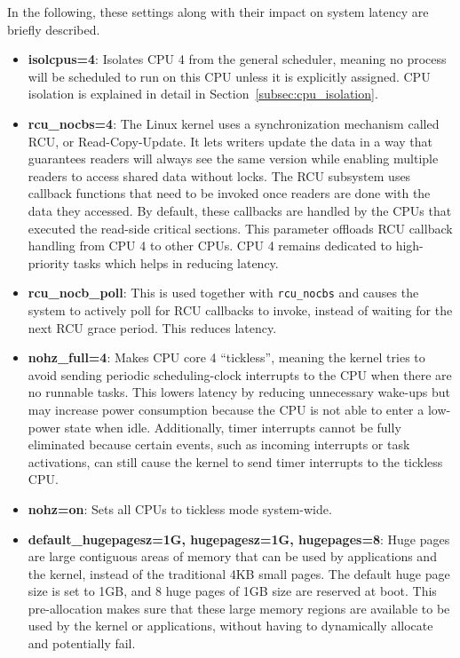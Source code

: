 \documentclass[MMR,Master,english]{twbook}
\begin{document}
\noindent In the following, these settings along with their impact on system latency are briefly described.

\begin{itemize}
	\item \textbf{isolcpus=4}: Isolates CPU 4 from the general scheduler, meaning no process will be scheduled to run on this CPU unless it is explicitly assigned. CPU isolation is explained in detail in Section~\ref{subsec:cpu_isolation}.
	\item \textbf{rcu\_nocbs=4}: The Linux kernel uses a synchronization mechanism called RCU, or Read-Copy-Update. It lets writers update the data in a way that guarantees readers will always see the same version while enabling multiple readers to access shared data without locks. The RCU subsystem uses callback functions that need to be invoked once readers are done with the data they accessed. By default, these callbacks are handled by the CPUs that executed the read-side critical sections. This parameter offloads RCU callback handling from CPU 4 to other CPUs. CPU 4 remains dedicated to high-priority tasks which helps in reducing latency.
	\item \textbf{rcu\_nocb\_poll}: This is used together with \texttt{rcu\_nocbs} and causes the system to actively poll for RCU callbacks to invoke, instead of waiting for the next RCU grace period. This reduces latency.
	\item \textbf{nohz\_full=4}: Makes CPU core 4 ``tickless'', meaning the kernel tries to avoid sending periodic scheduling-clock interrupts to the CPU when there are no runnable tasks. This lowers latency by reducing unnecessary wake-ups but may increase power consumption because the CPU is not able to enter a low-power state when idle. Additionally, timer interrupts cannot be fully eliminated because certain events, such as incoming interrupts or task activations, can still cause the kernel to send timer interrupts to the tickless CPU.
	\item \textbf{nohz=on}: Sets all CPUs to tickless mode system-wide.
	\item \textbf{default\_hugepagesz=1G, hugepagesz=1G, hugepages=8}: Huge pages are large contiguous areas of memory that can be used by applications and the kernel, instead of the traditional 4KB small pages. The default huge page size is set to 1GB, and 8 huge pages of 1GB size are reserved at boot. This pre-allocation makes sure that these large memory regions are available to be used by the kernel or applications, without having to dynamically allocate and potentially fail.

\end{itemize}
\end{document}
